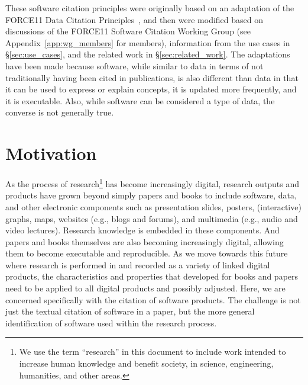 \documentclass[12pt, oneside]{amsart}
\newcommand{\katznote}[1]{ {\textcolor{blue} { ***DSK: #1 }}} %
\begin{document}
These software citation principles were originally based on an adaptation of the
FORCE11 Data Citation Principles~\cite{data-citation-principles}, and then were
modified based on discussions of the FORCE11 Software Citation Working
Group (see Appendix~\ref{app:wg_members} for members), information from the use
cases in \S\ref{sec:use_cases}, and the related work in \S\ref{sec:related_work}.
The adaptations have been made
because software, while similar to data in terms of not traditionally having
been cited in publications, is also different than data in that it can be used
to express or explain concepts, it is updated more frequently, and it is
executable.
Also, while software can be considered a type of data, the converse is not
generally true.




\section{Motivation}
\label{sec:intro}

As the process of research\footnote{We use the term ``research'' in this document to include work intended to increase human knowledge and benefit society, in science, engineering, humanities, and other areas.} has become increasingly digital, research outputs
and products have grown beyond simply papers and books to include software,
data, and other electronic components such as presentation slides, posters,
(interactive)  graphs, maps, websites (e.g., blogs and forums), and multimedia
(e.g., audio and  video lectures).  Research knowledge is embedded in these
components. And papers and books themselves are also becoming increasingly
digital, allowing them to become executable and reproducible. As we move towards
this future where research is performed in and recorded as a variety of linked
digital products, the characteristics and properties that developed for books
and papers need to be applied to all digital products and possibly adjusted.
Here, we are concerned specifically with the citation of software products. The
challenge is not just the textual citation of software in a paper, but the more
general identification of software used within the research process.
\end{document}
